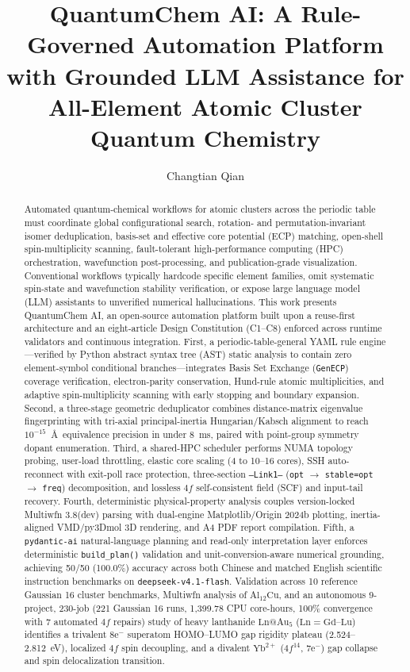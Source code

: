 \documentclass[journal=jcisd8,manuscript=article]{achemso}
\author{Changtian Qian}
\affiliation[Capital Normal University]{Department of Physics, Capital Normal University, Beijing 100048, China}
\title[QuantumChem AI]{QuantumChem AI: A Rule-Governed Automation Platform with Grounded LLM Assistance for All-Element Atomic Cluster Quantum Chemistry}
\begin{document}
\sloppy

\begin{abstract}
Automated quantum-chemical workflows for atomic clusters across the periodic table must coordinate global configurational search, rotation- and permutation-invariant isomer deduplication, basis-set and effective core potential (ECP) matching, open-shell spin-multiplicity scanning, fault-tolerant high-performance computing (HPC) orchestration, wavefunction post-processing, and publication-grade visualization. Conventional workflows typically hardcode specific element families, omit systematic spin-state and wavefunction stability verification, or expose large language model (LLM) assistants to unverified numerical hallucinations. This work presents QuantumChem AI, an open-source automation platform built upon a reuse-first architecture and an eight-article Design Constitution (C1--C8) enforced across runtime validators and continuous integration. First, a periodic-table-general YAML rule engine---verified by Python abstract syntax tree (AST) static analysis to contain zero element-symbol conditional branches---integrates Basis Set Exchange (\texttt{GenECP}) coverage verification, electron-parity conservation, Hund-rule atomic multiplicities, and adaptive spin-multiplicity scanning with early stopping and boundary expansion. Second, a three-stage geometric deduplicator combines distance-matrix eigenvalue fingerprinting with tri-axial principal-inertia Hungarian/Kabsch alignment to reach $10^{-15}$~\AA\ equivalence precision in under 8~ms, paired with point-group symmetry dopant enumeration. Third, a shared-HPC scheduler performs NUMA topology probing, user-load throttling, elastic core scaling (4 to 10--16 cores), SSH auto-reconnect with exit-poll race protection, three-section \texttt{--Link1--} (\texttt{opt} $\rightarrow$ \texttt{stable=opt} $\rightarrow$ \texttt{freq}) decomposition, and lossless $4f$ self-consistent field (SCF) and input-tail recovery. Fourth, deterministic physical-property analysis couples version-locked Multiwfn 3.8(dev) parsing with dual-engine Matplotlib/Origin 2024b plotting, inertia-aligned VMD/py3Dmol 3D rendering, and A4 PDF report compilation. Fifth, a \texttt{pydantic-ai} natural-language planning and read-only interpretation layer enforces deterministic \texttt{build\_plan()} validation and unit-conversion-aware numerical grounding, achieving 50/50 (100.0\%) accuracy across both Chinese and matched English scientific instruction benchmarks on \texttt{deepseek-v4.1-flash}. Validation across 10 reference Gaussian 16 cluster benchmarks, Multiwfn analysis of $\mathrm{Al_{12}Cu}$, and an autonomous 9-project, 230-job (221 Gaussian 16 runs, 1,399.78 CPU core-hours, 100\% convergence with 7 automated $4f$ repairs) study of heavy lanthanide $\mathrm{Ln@Au_5}$ ($\mathrm{Ln} = \mathrm{Gd\text{--}Lu}$) identifies a trivalent $8\mathrm{e}^-$ superatom HOMO--LUMO gap rigidity plateau (2.524--2.812~eV), localized $4f$ spin decoupling, and a divalent $\mathrm{Yb^{2+}}$ ($4f^{14}$, $7\mathrm{e}^-$) gap collapse and spin delocalization transition.
\end{abstract}
\end{document}

